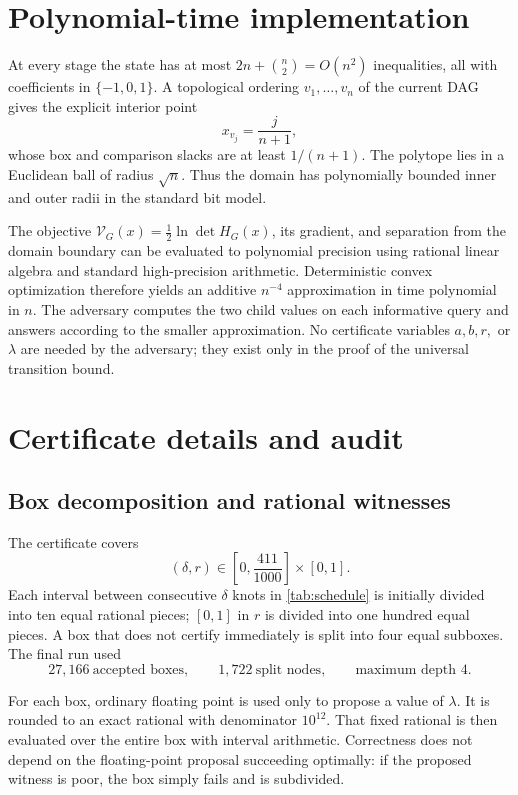 \documentclass[11pt]{article}
\theoremstyle{definition}
\newcommand{\Vnat}{\mathcal{V}}
\begin{document}
\section{Polynomial-time implementation}

At every stage the state has at most $2n+\binom n2=O(n^2)$ inequalities, all with coefficients in $\{-1,0,1\}$.  A topological ordering $v_1,\ldots,v_n$ of the current DAG gives the explicit interior point
\[
  x_{v_j}=\frac{j}{n+1},
\]
whose box and comparison slacks are at least $1/(n+1)$.  The polytope lies in a Euclidean ball of radius $\sqrt n$.  Thus the domain has polynomially bounded inner and outer radii in the standard bit model.

The objective $\Vnat_G(x)=\frac12\ln\det H_G(x)$, its gradient, and separation from the domain boundary can be evaluated to polynomial precision using rational linear algebra and standard high-precision arithmetic.  Deterministic convex optimization therefore yields an additive $n^{-4}$ approximation in time polynomial in $n$.  The adversary computes the two child values on each informative query and answers according to the smaller approximation.  No certificate variables $a,b,r,$ or $\lambda$ are needed by the adversary; they exist only in the proof of the universal transition bound.

\section{Certificate details and audit}
\label{sec:certificate-details}

\subsection{Box decomposition and rational witnesses}
The certificate covers
\[
  (\delta,r)\in\left[0,\frac{411}{1000}\right]\times[0,1].
\]
Each interval between consecutive $\delta$ knots in \cref{tab:schedule} is initially divided into ten equal rational pieces; $[0,1]$ in $r$ is divided into one hundred equal pieces.  A box that does not certify immediately is split into four equal subboxes.  The final run used
\[
  27{,}166\ \text{accepted boxes},\qquad
  1{,}722\ \text{split nodes},\qquad
  \text{maximum depth }4.
\]

For each box, ordinary floating point is used only to propose a value of $\lambda$.  It is rounded to an exact rational with denominator $10^{12}$.  That fixed rational is then evaluated over the entire box with interval arithmetic.  Correctness does not depend on the floating-point proposal succeeding optimally: if the proposed witness is poor, the box simply fails and is subdivided.
\end{document}
